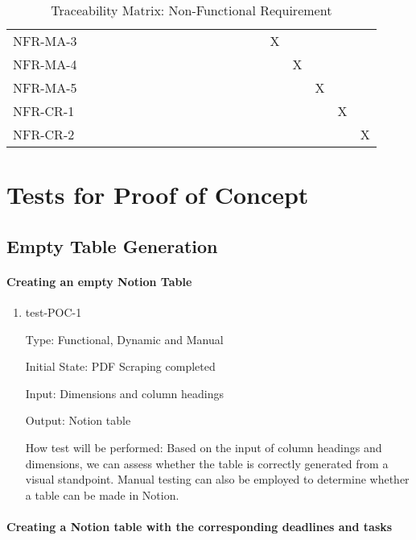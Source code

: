 \documentclass[12pt, titlepage]{article}
\begin{document}
\begin{table}[h!]
{\begin{tabular}{lccccccccccccccccccc}
\multicolumn{1}{l|}{NFR-MA-3} &  &  &  &  &  &  &  &  &  &  &  &  &  &  & X &  &  &  &  \\
\multicolumn{1}{l|}{NFR-MA-4} &  &  &  &  &  &  &  &  &  &  &  &  &  &  &  & X &  &  &  \\
\multicolumn{1}{l|}{NFR-MA-5} &  &  &  &  &  &  &  &  &  &  &  &  &  &  &  &  & X &  &  \\
\multicolumn{1}{l|}{NFR-CR-1} &  &  &  &  &  &  &  &  &  &  &  &  &  &  &  &  &  & X &  \\
\multicolumn{1}{l|}{NFR-CR-2} &  &  &  &  &  &  &  &  &  &  &  &  &  &  &  &  &  &  & X
\end{tabular}
}
\caption{Traceability Matrix: Non-Functional Requirement}
\label{Traceability Matrix: Non-Functional Requirement}
\end{table}

\normalsize

\section{Tests for Proof of Concept}

\subsection{Empty Table Generation}
		
\paragraph{Creating an empty Notion Table }

\begin{enumerate}

\item{test-POC-1\\}

Type: Functional, Dynamic and Manual 

Initial State: PDF Scraping completed

Input: Dimensions and column headings 

Output: Notion table

How test will be performed: Based on the input of column headings and dimensions, we can assess whether the table is correctly generated from a visual standpoint. Manual testing can also be employed to determine whether a table can be made in Notion. 

\end{enumerate}

\paragraph{Creating a Notion table with the corresponding deadlines and tasks}
\end{document}
